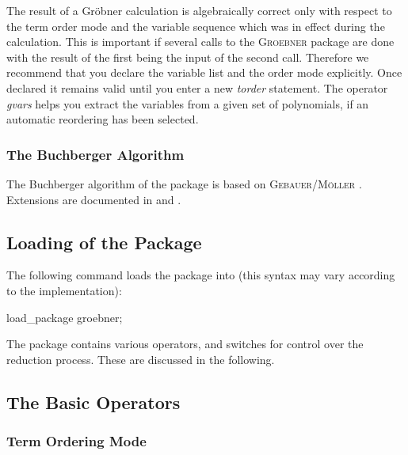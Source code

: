 The result of a Gr\"obner calculation is algebraically correct only
with respect to the term order mode and the variable sequence
which was in effect during the calculation. This is important if
several calls to the \textsc{Groebner} package are done with the result of the
first being the input of the second call. Therefore we recommend
that you declare the variable list and the order mode explicitly.
Once declared it remains valid until you enter a new \emph{torder}
statement. The operator \emph{gvars} helps you extract the variables
from a given set of polynomials, if an automatic reordering has been selected.

\subsubsection{The Buchberger Algorithm}
The Buchberger algorithm of the package is based on
\textsc{Gebauer/M\"oller} \cite{Gebauer:88}.
Extensions are documented in \cite{Melenk:88} and \cite{Giovini:91}.

\subsection{Loading of the Package}
The following command loads the package into
\REDUCE (this syntax may vary according to the implementation):
\begin{center}
load\_package groebner;
\end{center}

The package contains various operators, and switches for control
over the reduction process. These are discussed in the following.

\subsection{The Basic Operators}

\subsubsection{Term Ordering Mode}

